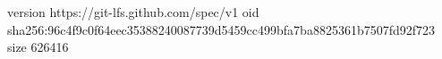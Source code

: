version https://git-lfs.github.com/spec/v1
oid sha256:96c4f9c0f64eec35388240087739d5459cc499bfa7ba8825361b7507fd92f723
size 626416
